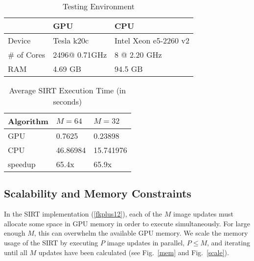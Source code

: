 \documentclass{sig-alternate}
\begin{document}
\begin{table}[h]
\begin{center}
\caption{Testing Environment}
\begin{tabular}{@{}p{2cm} p{2cm}  p{2cm} @{}}  %
&    GPU & CPU  \\ \toprule
Device   &  Tesla k20c  &  Intel Xeon e5-2260 v2 \\ \midrule
\# of Cores  & 2496@ 0.71GHz & 8 @ 2.20 GHz   \\ \midrule
RAM & 4.69 GB  &    94.5 GB           \\\bottomrule
\end{tabular} \label{test}
\end{center}
\end{table}


\begin{table}[h]
\begin{center}
\caption{Average SIRT Execution Time (in seconds)}
\begin{tabular}{@{}p{2cm} p{2cm}  p{2cm} @{}}\toprule
Algorithm   &    $M = 64$ & $M = 32$  \\ \midrule
GPU   &  0.7625  & 0.23898  \\
CPU   & 46.86984 & 15.741976 \\ \midrule
speedup &   65.4x & 65.9x  \\ \bottomrule
\end{tabular} \label{table1}
\end{center}
\end{table}



\subsection{Scalability and Memory Constraints}
%

In the SIRT implementation (\ref{fkplus12}), each of the $M$ image updates must allocate some space in GPU memory in order to execute simultaneously. For large enough $M$, this can overwhelm the available GPU memory. We scale the memory usage of the SIRT by executing $P$ image updates in parallel, $P \le M$, and iterating until all $M$ updates have been calculated (see Fig.~\ref{mem} and Fig.~\ref{scale}). 
\end{document}
